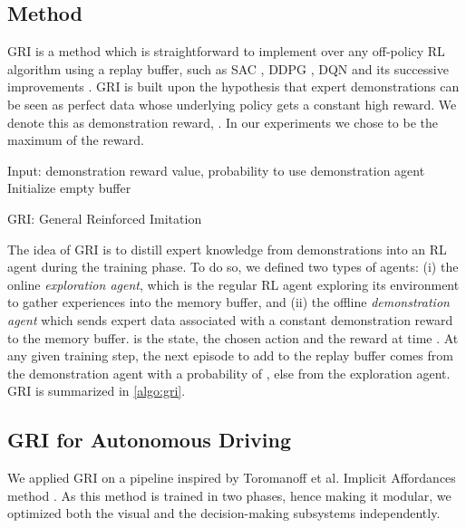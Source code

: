 \documentclass[letterpaper, 10 pt, conference]{ieeeconf}
\begin{document}
\subsection{Method}
\label{sec:gri}
GRI is a method which is straightforward to implement over any off-policy RL algorithm using a replay buffer, such as SAC \cite{sac}, DDPG \cite{ddpg}, DQN \cite{dqn} and its successive improvements \cite{rainbow, iqn}. GRI is built upon the hypothesis that expert demonstrations can be seen as perfect data whose underlying policy gets a constant high reward. We denote this as demonstration reward, . In our experiments we chose  to be the maximum of the reward.

\begin{algorithm}
\SetAlgoLined
Input:  demonstration reward value,  probability to use demonstration agent\;
 Initialize empty buffer \;

 \caption{GRI: General Reinforced Imitation}
 \label{algo:gri}
\end{algorithm}

The idea of GRI is to distill expert knowledge from demonstrations into an RL agent during the training phase. To do so, we defined two types of agents: (i) the online \textit{exploration agent}, which is the regular RL agent exploring its environment to gather experiences  into the memory buffer, and (ii) the offline \textit{demonstration agent} which sends expert data associated with a constant demonstration reward  to the memory buffer.  is the state,  the chosen action and  the reward at time . At any given training step, the next episode to add to the replay buffer comes from the demonstration agent with a probability of , else from the exploration agent. GRI is summarized in \cref{algo:gri}. 

\subsection{GRI for Autonomous Driving}
We applied GRI on a pipeline inspired by Toromanoff et al. Implicit Affordances method \cite{architecture-marin}. 
As this method is trained in two phases, hence making it modular, we optimized both the visual and the decision-making subsystems independently. \newline 
\end{document}
